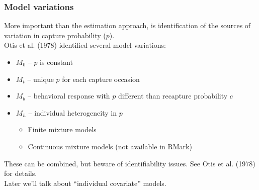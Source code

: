 \documentclass[color=usenames,dvipsnames]{beamer}\usepackage[]{graphicx}\usepackage[]{xcolor}
\begin{document}
\begin{frame}
  \frametitle{Model variations}
  \small
  More important than the estimation approach, is identification of
  the sources of variation in capture probability ($p$). \\ 
  \pause
  \vfill
  Otis et al. (1978) identified several model
  variations: 
  \begin{itemize}
    \small
    \item $M_0$ -- $p$ is constant
    \item $M_t$ -- unique $p$ for each capture occasion
    \item \hangindent=0.8cm $M_b$ -- behavioral response with $p$ different than
      recapture probability $c$
    \item $M_h$ -- individual heterogeneity in $p$
      \begin{itemize}
        \item Finite mixture models
        \item Continuous mixture models (not available in RMark)
      \end{itemize}
  \end{itemize}
  \pause \vfill
  These can be combined, but beware of identifiability issues. See
  Otis et al. (1978) for details.  \\
  \pause \vfill
  Later we'll talk about %
  ``individual covariate'' models.  
\end{frame}
\end{document}
